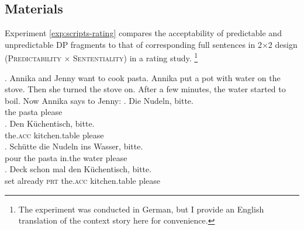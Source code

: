 \subsection{Materials}\label{sec:scripts-rating-materials}

Experiment \ref{exp:scripts-rating} compares the acceptability of predictable and unpredictable DP fragments \Next[a,b] to that of corresponding full sentences \Next[c,d] in  2$\times$2 design (\textsc{Pre\-dictability} $\times$ \textsc{Sententiality}) in a rating study.%
%
\footnote{The experiment was conducted in German, but I provide an English translation of the context story here for convenience.}\afterfn%
%

\ex. Annika and Jenny want to cook pasta. Annika put a pot with water on the stove. Then she turned the stove on. After a few minutes, the water started to boil. Now Annika says to Jenny: \label{ex:scripts-rating-item}
     \ag.  Die Nudeln, bitte.\\
	  the pasta please\\
	   
     \bg. Den Küchentisch, bitte.\\
	  the.\textsc{acc} kitchen.table please\\
	   
     \cg. Schütte die Nudeln ins Wasser, bitte.\\
	  pour the pasta in.the water please\\
     \dg. Deck schon mal den Küchentisch, bitte.\\
	  set already \textsc{prt} the.\textsc{acc} kitchen.table please\\

